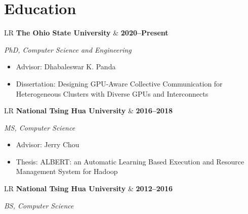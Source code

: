 \documentclass[10pt,a4paper,sans]{moderncv}          %
\newcommand*{\educationentry}[4][0.5mm]{
    \begin{tabularx}{\textwidth}{LR}
        {\bfseries #3} & {\bfseries #4} \\
    \end{tabularx}
    {\itshape #2}
    \par\addvspace{#1}
}
\begin{document}
\makecvtitle
\vspace*{-10mm}

\begin{minipage}[t]{0.64\textwidth}


\section{Education}
\educationentry{PhD, Computer Science and Engineering}{The Ohio State University}{
2020--Present
}{
  \begin{itemize}
  \item Advisor: Dhabaleswar K. Panda
  \item Dissertation: Designing GPU-Aware Collective Communication for Heterogeneous Clusters with Diverse GPUs and Interconnects
  \end{itemize}
}
\educationentry{MS, Computer Science}{National Tsing Hua University}{
2016--2018
}{
\begin{itemize}
  \item Advisor: Jerry Chou
  \item Thesis: ALBERT: an Automatic Learning Based Execution and Resource Management System for Hadoop
  \end{itemize}
}
\educationentry{BS, Computer Science}{National Tsing Hua University}{
2012--2016
}{
}  %

\end{minipage}
\hfill
\end{document}
